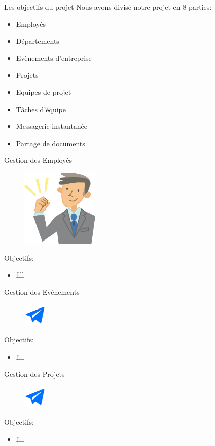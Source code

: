 \begin{frame}{Les objectifs du projet}
 Nous avons divisé notre projet en 8 parties:
  \begin{itemize}
  \item Employés
\item Départements
 \item Evènements d'entreprise
 \item Projets
 \item Equipes de projet
 \item Tâches d'équipe
  \item Messagerie instantanée
\item Partage de documents
    \end{itemize}
\end{frame}

\begin{frame}{Gestion des Employés}
\begin{figure}[h!]
  \includegraphics[width=0.33\textwidth]{images/employee}
\end{figure}
Objectifs:
  \begin{itemize}
\item fill
    \end{itemize}
\end{frame}

\begin{frame}{Gestion des Evènements}
\begin{figure}[h!]
  \includegraphics[width=0.10\textwidth]{images/-59-512}
\end{figure}
Objectifs:
  \begin{itemize}
\item fill
    \end{itemize}
\end{frame}


\begin{frame}{Gestion des Projets}
\begin{figure}[h!]
  \includegraphics[width=0.10\textwidth]{images/-59-512}
\end{figure}
Objectifs:
  \begin{itemize}
\item fill
    \end{itemize}
\end{frame}

